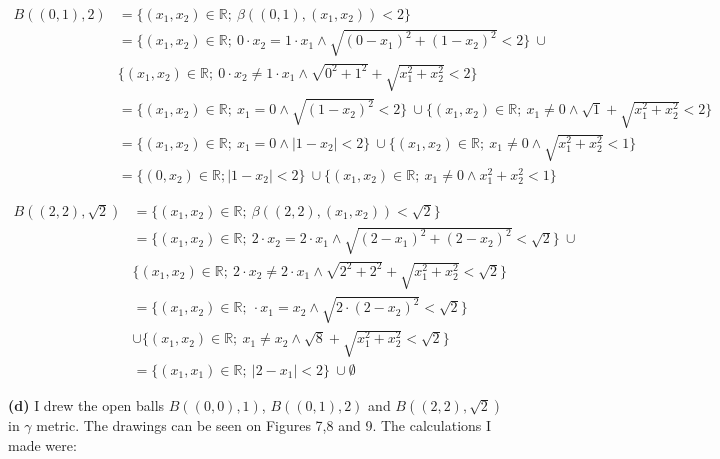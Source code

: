 \documentclass[12pt]{article}
\begin{document}
	\begin{align*} B((0,1), 2) &= \{(x_{1}, x_{2}) \in \mathbb{R}; \ \beta((0,1),(x_{1}, x_{2}))<2\} \\
		&= \{(x_{1}, x_{2}) \in \mathbb{R}; \ 0 \cdot x_{2} = 1 \cdot x_{1} \land  \sqrt{(0-x_{1})^2 + (1-x_{2})^2} < 2 \} \ \cup \\ 
		&\{(x_{1}, x_{2}) \in \mathbb{R}; \ 0 \cdot x_{2} \neq 1 \cdot x_{1} \land  \sqrt{0^2 + 1^2} + \sqrt{x_{1}^2 + x_{2}^2} < 2 \} \\
		&=\{(x_{1}, x_{2}) \in \mathbb{R}; \ x_{1} = 0 \land  \sqrt{(1-x_{2})^2} < 2 \} \ \cup 
		\{(x_{1}, x_{2}) \in \mathbb{R}; \ x_{1} \neq 0 \land  \sqrt{1} + \sqrt{x_{1}^2 + x_{2}^2} < 2 \} \\ 
		&=\{(x_{1}, x_{2}) \in \mathbb{R}; \ x_{1} = 0 \land  |1-x_{2}| < 2 \} \ \cup 
		\{(x_{1}, x_{2}) \in \mathbb{R}; \ x_{1} \neq 0 \land \sqrt{x_{1}^2 + x_{2}^2} < 1 \} \\ 
		&=\{(0, x_{2}) \in \mathbb{R}; |1-x_{2}| < 2 \} \ \cup 
		\{(x_{1}, x_{2}) \in \mathbb{R}; \ x_{1} \neq 0 \land x_{1}^2 + x_{2}^2 < 1 \}
	\end{align*}

	\begin{align*} B((2,2), \sqrt{2}) &= \{(x_{1}, x_{2}) \in \mathbb{R}; \ \beta((2,2),(x_{1}, x_{2}))<\sqrt{2}\} \\
		&= \{(x_{1}, x_{2}) \in \mathbb{R}; \ 2 \cdot x_{2} = 2 \cdot x_{1} \land  \sqrt{(2-x_{1})^2 + (2-x_{2})^2} < \sqrt{2} \} \ \cup \\ 
		&\{(x_{1}, x_{2}) \in \mathbb{R}; \ 2 \cdot x_{2} \neq 2 \cdot x_{1} \land  \sqrt{2^2 + 2^2} + \sqrt{x_{1}^2 + x_{2}^2} < \sqrt{2} \} \\
		&=\{(x_{1}, x_{2}) \in \mathbb{R}; \ \cdot x_{1} = x_{2} \land  \sqrt{2\cdot(2-x_{2})^2} < \sqrt{2} \} \\
		&\cup 
		\{(x_{1}, x_{2}) \in \mathbb{R}; \ x_{1} \neq x_{2} \land \sqrt{8} + \sqrt{x_{1}^2 + x_{2}^2} < \sqrt{2} \} \\ 
		&=\{(x_{1}, x_{1}) \in \mathbb{R}; \ |2-x_{1}| < 2 \} \ \cup \emptyset
	\end{align*}

	\textbf{(d)} I drew the open balls $B((0,0), 1)$, $B((0,1), 2)$ and $B((2,2), \sqrt{2})$ in $\gamma$ metric. The drawings can be seen on Figures 7,8 and 9. The calculations I made were: 
	
\end{document}
